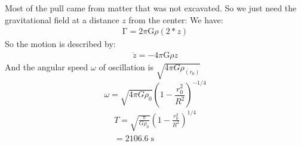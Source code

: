 \begin{solution}

Most of the pull came from matter that was not excavated. So we just 
need the gravitational field at a distance $z$ from the center:
We have:
\begin{gather*}
 \mathrm{\Gamma} = 2 \pi \mathrm{G} \rho (2 * z) 
\end{gather*}
So the motion is described by:
\begin{gather*}
    \ddot{z} = -4 \pi \mathrm{G} \rho z 
\end{gather*}
And the angular speed $\omega$ of oscillation is 
\(\sqrt{4\pi G\rho_{\left( r_0 \right)}}\)
\begin{equation}
    \omega = \sqrt{4\pi G \rho_0} {\left(1 - \frac{r_0^2}{R^2} 
    \right)} ^ {-1 / 4} 
    \label{densityDistribution}
\end{equation}
\begin{gather}
    T= \sqrt{\frac{\pi} {G \rho_0}} {\left(1 - \frac{r_0^2}{R^2} 
    \right)} ^ {1 / 4} \\
    = 2106.6 \;\mathrm{s}
\end{gather}
\end{solution}